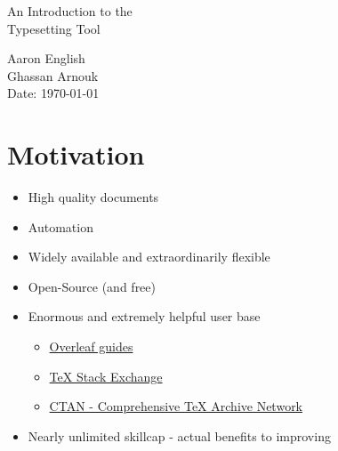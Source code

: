 \documentclass[hidelinks, 12pt]{article}%
\begin{document}
    \begin{center}
        \vspace*{1cm}
        {\fontsize{300}{50}\selectfont {\bfseries Hello \LaTeX\\}}
        \vspace{3cm}
        {\LARGE An Introduction to the\\
            Typesetting Tool\\}
        \vspace{9cm}
    \end{center}
    \begin{raggedleft}
        {\Large Aaron English\\
            Ghassan Arnouk\\
            Date: \today\\}
    \end{raggedleft}
    \thispagestyle{empty}

    \clearpage
    \tableofcontents
    \clearpage
    \section{Motivation}
        \begin{itemize}
            \item High quality documents
            \item Automation
            \item Widely available and extraordinarily flexible
            \item Open-Source (and free)
            \item Enormous and extremely helpful user base
                \begin{itemize}
                    \item \href{https://www.overleaf.com/learn}{Overleaf guides}
                    \item \href{https://tex.stackexchange.com/}{TeX Stack Exchange}
                    \item \href{https://www.ctan.org/}{CTAN - Comprehensive TeX Archive Network}
                \end{itemize}
            \item Nearly unlimited skillcap - actual benefits to improving
        \end{itemize}
\end{document}
